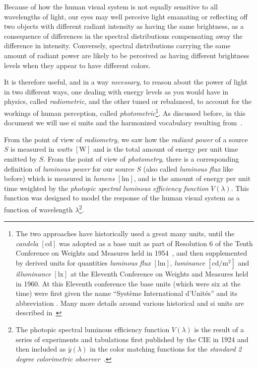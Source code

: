 Because of how the human visual system is not equally sensitive to all wavelengths
of light, our eyes may well perceive light emanating or reflecting 
off two objects with different radiant intensity as having the same brightness, 
as a consequence of differences in the spectral distributions compensating 
away the difference in intensity. 
Conversely, \glspl{spectral distribution} carrying the same amount
of radiant power are likely to be perceived as having different brightness levels 
when they appear to have different colors.

It is therefore useful, and in a way \emph{necessary}, to reason about the power 
of light in two different ways, one dealing with energy levels as you would have in 
physics, called \textsl{radiometric}, and the other tuned or rebalanced, to account 
for the workings of human perception, called \textsl{photometric}\footnote{ 
The two approaches have historically used a great many units, 
until the \textsl{\gls{candela}} $[\unit\candela]$ was adopted as a base unit 
as part of Resolution 6 of the Tenth Conference on Weights and Measures
held in 1954~\cite[p. 163]{bipm:si.2019}, and then supplemented by derived units for
quantities \textsl{\gls{luminous flux}} $[\unit\lumen]$, 
\textsl{\gls{luminance}} $[\unit{\candela\per\square\meter}]$ 
and \textsl{\gls{illuminance}} $[\unit\lux]$ at the Eleventh Conference on Weights 
and Measures held in 1960.  
At this Eleventh conference the base units (which were six at the time) were first
given the name ``Syst\`eme International d’Unit\'es” and its abbreviation .
Many more details around various historical and \gls{si} units are
described in~\cite{Meyer-Arendt:68}}. 
As discussed before, in this document we will use \gls{si} units and the harmonized 
vocabulary resulting from~\cite{iso:80000-7:2019,cie:s017.2020,iec:60050-845:2020}.

From the point of view of \textsl{\gls{radiometry}}, we saw how the \textsl{radiant power} 
of a source $S$ is measured in \textit{watts} $[\unit{\watt}]$ and is the total amount 
of energy per unit time emitted by $S$.
From the point of view of \textsl{\gls{photometry}}, there is a corresponding definition
of \textsl{luminous power} for our source $S$ (also called \textsl{luminous flux} like before) 
which is measured in \textit{lumens} $[\unit{\lumen}]$, and is the amount of energy per unit time
weighted by the \textsl{photopic spectral luminous efficiency function} $V(\lambda)$. 
This function was designed to model the response of the human visual system as a function of 
wavelength $\lambda$\footnote{
	The photopic spectral luminous efficiency function $V(\lambda)$ is the result of a 
	series of experiments and tabulations first published by the \gls{CIE} in 1924 
	and then included as $\bar y(\lambda)$ in the color matching functions for 
	the \emph{standard 2 degree colorimetric observer}~\cite{smithgould1931}.}.

